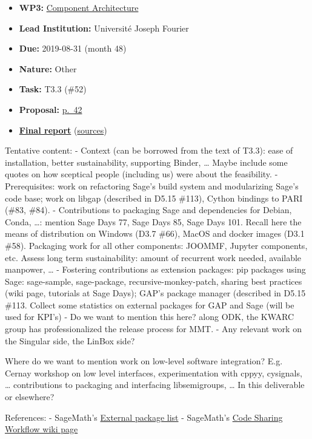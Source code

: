 \begin{itemize}
\tightlist
\item
  \textbf{WP3:}
  \href{https://github.com/OpenDreamKit/OpenDreamKit/tree/master/WP3}{Component
  Architecture}
\item
  \textbf{Lead Institution:} Université Joseph Fourier
\item
  \textbf{Due:} 2019-08-31 (month 48)
\item
  \textbf{Nature:} Other
\item
  \textbf{Task:} T3.3 (\#52)
\item
  \textbf{Proposal:}
  \href{https://github.com/OpenDreamKit/OpenDreamKit/raw/master/Proposal/proposal-www.pdf}{p.~42}
\item
  \textbf{\href{https://github.com/OpenDreamKit/OpenDreamKit/raw/master/WP3/D3.10/report-final.pdf}{Final
  report}}
  (\href{https://github.com/OpenDreamKit/OpenDreamKit/raw/master/WP3/D3.10/}{sources})
\end{itemize}

Tentative content: - Context (can be borrowed from the text of T3.3):
ease of installation, better sustainability, supporting Binder, \ldots{}
Maybe include some quotes on how sceptical people (including us) were
about the feasibility. - Prerequisites: work on refactoring Sage's build
system and modularizing Sage's code base; work on libgap (described in
D5.15 \#113), Cython bindings to PARI (\#83, \#84). - Contributions to
packaging Sage and dependencies for Debian, Conda, \ldots: mention Sage
Days 77, Sage Days 85, Sage Days 101. Recall here the means of
distribution on Windows (D3.7 \#66), MacOS and docker images (D3.1
\#58). Packaging work for all other components: JOOMMF, Jupyter
components, etc. Assess long term sustainability: amount of recurrent
work needed, available manpower, \ldots{} - Fostering contributions as
extension packages: pip packages using Sage: sage-sample, sage-package,
recursive-monkey-patch, sharing best practices (wiki page, tutorials at
Sage Days); GAP's package manager (described in D5.15 \#113. Collect
some statistics on external packages for GAP and Sage (will be used for
KPI's) - Do we want to mention this here? along ODK, the KWARC group has
professionalized the release process for MMT. - Any relevant work on the
Singular side, the LinBox side?

Where do we want to mention work on low-level software integration? E.g.
Cernay workshop on low level interfaces, experimentation with cppyy,
cysignals, \ldots{} contributions to packaging and interfacing
libsemigroups, \ldots{} In this deliverable or elsewhere?

References: - SageMath's
\href{https://wiki.sagemath.org/SageMathExternalPackages}{External
package list} - SageMath's
\href{https://wiki.sagemath.org/CodeSharingWorkflow}{Code Sharing
Workflow wiki page}

